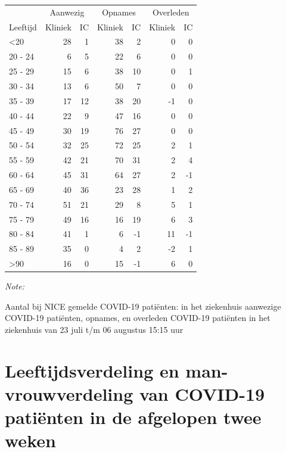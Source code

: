 \documentclass[
  english,
  man,floatsintext]{apa6}
\begin{document}
\begin{table}
\centering\begingroup\fontsize{10}{12}\selectfont

\begin{threeparttable}
\begin{tabular}{lrrrrrr}
\toprule
\multicolumn{1}{c}{ } & \multicolumn{2}{c}{Aanwezig} & \multicolumn{2}{c}{Opnames} & \multicolumn{2}{c}{Overleden} \\
\cmidrule(l{3pt}r{3pt}){2-3} \cmidrule(l{3pt}r{3pt}){4-5} \cmidrule(l{3pt}r{3pt}){6-7}
Leeftijd & Kliniek & IC & Kliniek & IC & Kliniek & IC\\
\midrule
<20 & 28 & 1 & 38 & 2 & 0 & 0\\
20 - 24 & 6 & 5 & 22 & 6 & 0 & 0\\
25 - 29 & 15 & 6 & 38 & 10 & 0 & 1\\
30 - 34 & 13 & 6 & 50 & 7 & 0 & 0\\
35 - 39 & 17 & 12 & 38 & 20 & -1 & 0\\
40 - 44 & 22 & 9 & 47 & 16 & 0 & 0\\
45 - 49 & 30 & 19 & 76 & 27 & 0 & 0\\
50 - 54 & 32 & 25 & 72 & 25 & 2 & 1\\
55 - 59 & 42 & 21 & 70 & 31 & 2 & 4\\
60 - 64 & 45 & 31 & 64 & 27 & 2 & -1\\
65 - 69 & 40 & 36 & 23 & 28 & 1 & 2\\
70 - 74 & 51 & 21 & 29 & 8 & 5 & 1\\
75 - 79 & 49 & 16 & 16 & 19 & 6 & 3\\
80 - 84 & 41 & 1 & 6 & -1 & 11 & -1\\
85 - 89 & 35 & 0 & 4 & 2 & -2 & 1\\
>90 & 16 & 0 & 15 & -1 & 6 & 0\\
\bottomrule
\end{tabular}
\begin{tablenotes}
\item \textit{Note: } 
\item Aantal bij NICE gemelde COVID-19 patiënten: in het ziekenhuis aanwezige COVID-19 patiënten, opnames, en overleden COVID-19 patiënten in het ziekenhuis van 23 juli t/m 06 augustus 15:15 uur
\end{tablenotes}
\end{threeparttable}
\endgroup{}
\end{table}

\newpage

\hypertarget{leeftijdsverdeling-en-man-vrouwverdeling-van-covid-19-patiuxebnten-in-de-afgelopen-twee-weken}{%
\section{Leeftijdsverdeling en man-vrouwverdeling van COVID-19 patiënten in de afgelopen twee weken}\label{leeftijdsverdeling-en-man-vrouwverdeling-van-covid-19-patiuxebnten-in-de-afgelopen-twee-weken}}
\end{document}
